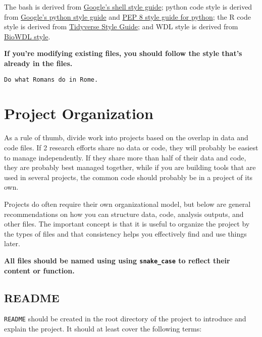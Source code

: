 \documentclass[
]{book}
\begin{document}
The bash is derived from
\href{https://google.github.io/styleguide/shellguide.html}{Google's shell style guide};
python code style is derived from
\href{https://www.python.org/dev/peps/pep-0008/}{Google's python style guide} and
\href{https://www.python.org/dev/peps/pep-0008/}{PEP 8 style guide for python};
the R code style is derived from
\href{https://style.tidyverse.org/}{Tidyverse Style Guide}; and WDL style is derived from \href{https://biowdl.github.io/styleGuidelines.html}{BioWDL style}.

\textbf{If you're modifying existing files, you should follow the style that's already
in the files.}

\begin{verbatim}
Do what Romans do in Rome.
\end{verbatim}

\hypertarget{project-organization-1}{%
\chapter{Project Organization}\label{project-organization-1}}

As a rule of thumb, divide work into projects based on the overlap in data and
code files. If 2 research efforts share no data or code, they will probably be
easiest to manage independently. If they share more than half of their data and
code, they are probably best managed together, while if you are building tools
that are used in several projects, the common code should probably be in a
project of its own.

Projects do often require their own organizational model, but below are general
recommendations on how you can structure data, code, analysis outputs, and other
files. The important concept is that it is useful to organize the project by
the types of files and that consistency helps you effectively find and use
things later.

\textbf{All files should be named using using \texttt{snake\_case} to reflect their content or
function.}

\hypertarget{readme}{%
\section{README}\label{readme}}

\texttt{README} should be created in the root directory of the project to introduce
and explain the project. It should at least cover the following terms:
\end{document}
